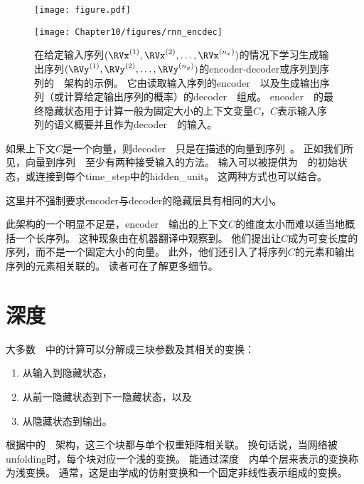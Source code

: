 \begin{figure}[!htb]
\ifOpenSource
\centerline{\texttt{[image: figure.pdf]}}
\else
\centerline{\texttt{[image: Chapter10/figures/rnn\_encdec]}}
\fi
\caption{在给定输入序列$(\RVx^{(1)},\RVx^{(2)},\dots,\RVx^{(n_x)})$的情况下学习生成输出序列$(\RVy^{(1)},\RVy^{(2)},\dots,\RVy^{(n_y)})$的\gls{encoder}-\gls{decoder}或序列到序列的~~架构的示例。 
它由读取输入序列的\gls{encoder}~~以及生成输出序列（或计算给定输出序列的概率）的\gls{decoder}~~组成。
\gls{encoder}~~的最终隐藏状态用于计算一般为固定大小的上下文变量$C$，$C$表示输入序列的语义概要并且作为\gls{decoder}~~的输入。
}
\label{fig:chap10_rnn_encdec}
\end{figure}

如果上下文$C$是一个向量，则\gls{decoder}~~只是在描述的向量到序列~。
正如我们所见，向量到序列~~至少有两种接受输入的方法。
输入可以被提供为~~的初始状态，或连接到每个\gls{time_step}中的\gls{hidden_unit}。
这两种方式也可以结合。

这里并不强制要求\gls{encoder}与\gls{decoder}的隐藏层具有相同的大小。

此架构的一个明显不足是，\gls{encoder}~~输出的上下文$C$的维度太小而难以适当地概括一个长序列。
这种现象由\cite{Bahdanau-et-al-ICLR2015-small}在机器翻译中观察到。
他们提出让$C$成为可变长度的序列，而不是一个固定大小的向量。
此外，他们还引入了将序列$C$的元素和输出序列的元素相关联的。
读者可在了解更多细节。


\section{深度}
\label{sec:deep_recurrent_networks}
大多数~~中的计算可以分解成三块参数及其相关的变换：
\begin{enumerate}
 \item 从输入到隐藏状态，
 \item 从前一隐藏状态到下一隐藏状态，以及
 \item 从隐藏状态到输出。
\end{enumerate}
根据中的~~架构，这三个块都与单个权重矩阵相关联。
换句话说，当网络被\gls{unfolding}时，每个块对应一个浅的变换。
能通过深度~~内单个层来表示的变换称为浅变换。
通常，这是由学成的仿射变换和一个固定非线性表示组成的变换。

